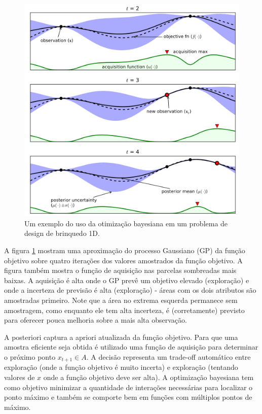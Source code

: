 \documentclass[
	12pt,				%
	a4paper,		%
	oneside,    %
	chapter=TITLE,		   %
	section=TITLE,		   %
	subsection=TITLE,	   %
	subsubsection=TITLE, %
	english,			%
	french,				%
	spanish,			%
	brazil,				%
]{abntex2}
\begin{document}
\begin{figure}
\centering
\includegraphics[width=\textwidth,height=0.6\textheight]{fig/bo.png}
\caption{Um exemplo do uso da otimização bayesiana em um problema de
design de brinquedo 1D.\label{bo}}
\end{figure}

A figura \ref{bo} mostram uma aproximação do processo Gaussiano (GP) da
função objetivo sobre quatro iterações dos valores amostrados da função
objetivo. A figura também mostra o função de aquisição nas parcelas
sombreadas mais baixas. A aquisição é alta onde o GP prevê um objetivo
elevado (exploração) e onde a incerteza de previsão é alta (exploração)
- áreas com os dois atributos são amostradas primeiro. Note que a área
no extrema esquerda permanece sem amostragem, como enquanto ele tem alta
incerteza, é (corretamente) previsto para oferecer pouca melhoria sobre
a mais alta observação.

A posteriori captura a apriori atualizada da função objetivo. Para que
uma amostra eficiente seja obtida é utilizado uma função de aquisição
para determinar o próximo ponto \(x_{t+1} \in A\). A decisão representa
um trade-off automático entre exploração (onde a função objetivo é muito
incerta) e exploração (tentando valores de \(x\) onde a função objetivo
deve ser alta). A optimização bayesiana tem como objetivo minimizar a
quantidade de interações necessárias para localizar o ponto máximo e
também se comporte bem em funções com múltiplos pontos de máximo.
\end{document}
